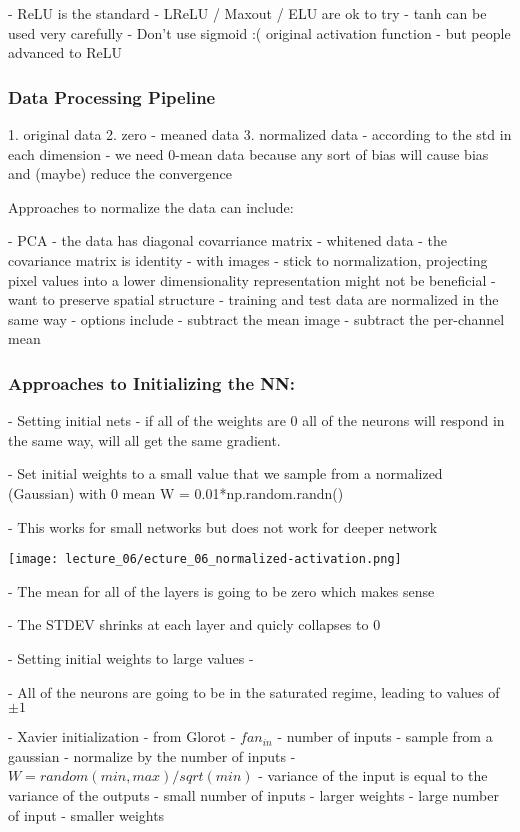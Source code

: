 - ReLU is the standard
- LReLU / Maxout / ELU are ok to try
- tanh can be used very carefully
- Don't use sigmoid :( original activation function - but people advanced to ReLU

\subsubsection{Data Processing Pipeline}

1. original data
2. zero - meaned data
3. normalized data - according to the std in each dimension
   - we need 0-mean data because any sort of bias will cause bias and (maybe) reduce the convergence

Approaches to normalize the data can include:

	- PCA - the data has diagonal covarriance matrix 
	- whitened data - the covariance matrix is identity
	- with images - stick to normalization, projecting pixel values into a lower dimensionality representation might not be beneficial
	- want to preserve spatial structure
	- training and test data are normalized in the same way
	- options include - subtract the mean image
	- subtract the per-channel mean

\subsubsection{Approaches to Initializing the NN:}

 - Setting initial nets - if all of the weights are 0 all of the neurons will respond in the same way, will all get the same gradient. 

 - Set initial weights to a small value that we sample from a normalized (Gaussian) with 0 mean W = 0.01*np.random.randn()
   	
   	- This works for small networks but does not work for deeper network
      	
      	\texttt{[image: lecture\_06/ecture\_06\_normalized-activation.png]}
    
   - The mean for all of the layers is going to be zero which makes sense 

   - The STDEV shrinks at each layer and quicly collapses to 0 

 - Setting initial weights to large values - 
   	
   	
   
   - All of the neurons are going to be in the saturated regime, leading to values of $\pm1$ 
   
 - Xavier initialization - from Glorot
    - ${fan_{in}}$ - number of inputs
    - sample from a gaussian
    - normalize by the number of inputs
    - $W = random(min,max)/sqrt(min)$
    - variance of the input is equal to the variance of the outputs
       - small number of inputs - larger weights
       - large number of input - smaller weights
    
